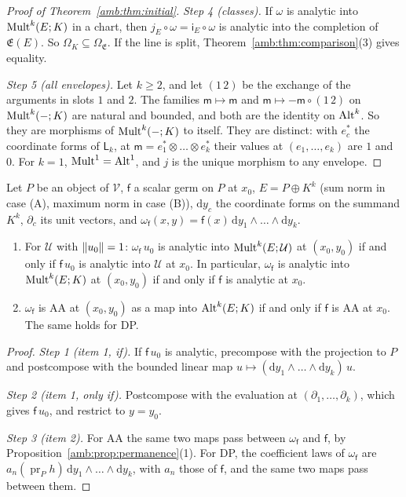 \begin{proof}[Proof of Theorem~\ref{amb:thm:initial}]
\emph{Step 4 (classes).} If $\omega$ is analytic into $\operatorname{Mult}^k(E;K)$ in a chart, then $j_E\circ\omega=\mathsf i_E\circ\omega$ is analytic into the completion of $\mathfrak E(E)$. So $\Omega_K\subseteq\Omega_{\mathfrak E}$. If the line is split, Theorem~\ref{amb:thm:comparison}(3) gives equality.

\emph{Step 5 (all envelopes).} Let $k\ge2$, and let $(1\,2)$ be the exchange of the arguments in slots $1$ and $2$. The families $\mathsf m\mapsto\mathsf m$ and $\mathsf m\mapsto-\mathsf m\circ(1\,2)$ on $\operatorname{Mult}^k(-;K)$ are natural and bounded, and both are the identity on $\operatorname{Alt}^k$. So they are morphisms of $\operatorname{Mult}^k(-;K)$ to itself. They are distinct: with $e^*_c$ the coordinate forms of $\mathsf L_k$, at $\mathsf m=e_1^*\otimes\dots\otimes e_k^*$ their values at $(e_1,\dots,e_k)$ are $1$ and $0$. For $k=1$, $\operatorname{Mult}^1=\operatorname{Alt}^1$, and $j$ is the unique morphism to any envelope.
\end{proof}

\begin{lemma}\label{amb:lem:scalars}
Let $P$ be an object of $\mathcal V$, $\mathsf f$ a scalar germ on $P$ at $x_0$, $E=P\oplus K^k$ \textup{(}sum norm in case \textup{(A)}, maximum norm in case \textup{(B)}\textup{)}, $\mathrm dy_c$ the coordinate forms on the summand $K^k$, $\partial_c$ its unit vectors, and $\omega_{\mathsf f}(x,y)=\mathsf f(x)\,\mathrm dy_1\wedge\dots\wedge\mathrm dy_k$.
\begin{enumerate}
\item For $\mathcal U$ with $\lVert u_0\rVert=1$: $\omega_{\mathsf f}\,u_0$ is analytic into $\operatorname{Mult}^k(E;\mathcal U)$ at $(x_0,y_0)$ if and only if $\mathsf f\,u_0$ is analytic into $\mathcal U$ at $x_0$. In particular, $\omega_{\mathsf f}$ is analytic into $\operatorname{Mult}^k(E;K)$ at $(x_0,y_0)$ if and only if $\mathsf f$ is analytic at $x_0$.
\item $\omega_{\mathsf f}$ is AA at $(x_0,y_0)$ as a map into $\operatorname{Alt}^k(E;K)$ if and only if $\mathsf f$ is AA at $x_0$. The same holds for DP.
\end{enumerate}
\end{lemma}

\begin{proof}
\emph{Step 1 (item 1, if).} If $\mathsf f\,u_0$ is analytic, precompose with the projection to $P$ and postcompose with the bounded linear map $u\mapsto(\mathrm dy_1\wedge\dots\wedge\mathrm dy_k)\,u$.

\emph{Step 2 (item 1, only if).} Postcompose with the evaluation at $(\partial_1,\dots,\partial_k)$, which gives $\mathsf f\,u_0$, and restrict to $y=y_0$.

\emph{Step 3 (item 2).} For AA the same two maps pass between $\omega_{\mathsf f}$ and $\mathsf f$, by Proposition~\ref{amb:prop:permanence}(1). For DP, the coefficient laws of $\omega_{\mathsf f}$ are $a_n(\operatorname{pr}_Ph)\,\mathrm dy_1\wedge\dots\wedge\mathrm dy_k$, with $a_n$ those of $\mathsf f$, and the same two maps pass between them.
\end{proof}

